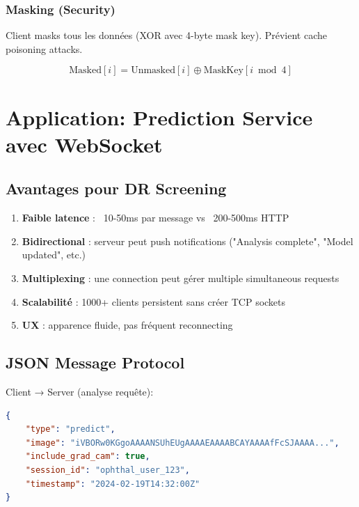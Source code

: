 \documentclass[12pt,a4paper,oneside]{report}
\begin{document}
\subsubsection{Masking (Security)}

Client masks tous les données (XOR avec 4-byte mask key). Prévient 
cache poisoning attacks.

\begin{equation}
\text{Masked}[i] = \text{Unmasked}[i] \oplus \text{MaskKey}[i \bmod 4]
\end{equation}

\section{Application: Prediction Service avec WebSocket}

\subsection{Avantages pour DR Screening}

\begin{enumerate}
    \item \textbf{Faible latence} : ~10-50ms par message vs ~200-500ms HTTP
    \item \textbf{Bidirectional} : serveur peut push notifications 
          ("Analysis complete", "Model updated", etc.)
    \item \textbf{Multiplexing} : une connection peut gérer 
          multiple simultaneous requests
    \item \textbf{Scalabilité} : 1000+ clients persistent sans 
          créer TCP sockets
    \item \textbf{UX} : apparence fluide, pas fréquent reconnecting
\end{enumerate}

\subsection{JSON Message Protocol}

Client → Server (analyse requête):

\begin{lstlisting}[language=json, caption=WebSocket 
message format (request)]
{
    "type": "predict",
    "image": "iVBORw0KGgoAAAANSUhEUgAAAAEAAAABCAYAAAAfFcSJAAAA...",
    "include_grad_cam": true,
    "session_id": "ophthal_user_123",
    "timestamp": "2024-02-19T14:32:00Z"
}
\end{lstlisting}
\end{document}
